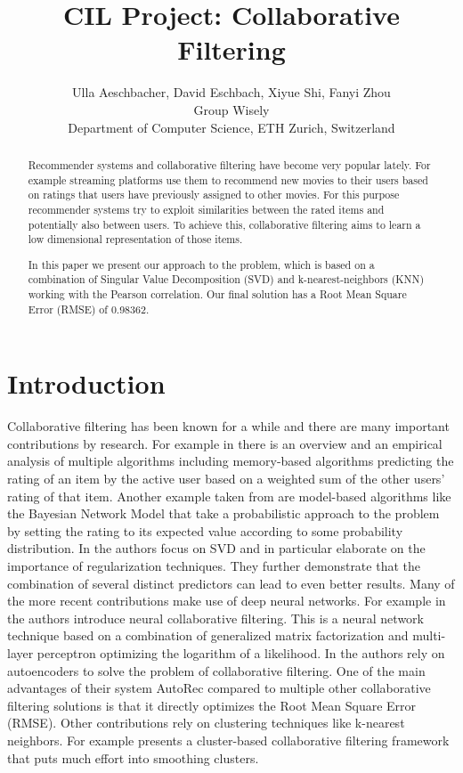 \documentclass[10pt,conference,compsocconf]{IEEEtran}
\begin{document}
\title{CIL Project: Collaborative Filtering}

\author{
	Ulla Aeschbacher, David Eschbach,  Xiyue Shi, Fanyi Zhou\\
	Group Wisely\\
	Department of Computer Science, ETH Zurich, Switzerland
}

\maketitle

\begin{abstract}
Recommender systems and collaborative filtering have become very popular lately. For example streaming platforms use them to recommend new movies to their users based on ratings that users have previously assigned to other movies. For this purpose recommender systems try to exploit similarities between the rated items and potentially also between users. To achieve this, collaborative filtering aims to learn a low dimensional representation of those items.

In this paper we present our approach to the problem, which is based on a combination of Singular Value Decomposition (SVD) and k-nearest-neighbors (KNN) working with the Pearson correlation. Our final solution has a Root Mean Square Error (RMSE) of 0.98362.
\end{abstract}

\section{Introduction}
Collaborative filtering has been known for a while and there are many important contributions by research. For example in \cite{breese} there is an overview and an empirical analysis of multiple algorithms including memory-based algorithms predicting the rating of an item by the active user based on a weighted sum of the other users' rating of that item. Another example taken from \cite{breese} are model-based algorithms like the Bayesian Network Model that take a probabilistic approach to the problem by setting the rating to its expected value according to some probability distribution. In \cite{paterek} the authors focus on SVD and in particular elaborate on the importance of regularization techniques. They further demonstrate that the combination of several distinct predictors can lead to even better results. Many of the more recent contributions make use of deep neural networks. For example in \cite{he} the authors introduce neural collaborative filtering. This is a neural network technique based on a combination of generalized matrix factorization and multi-layer perceptron optimizing the logarithm of a likelihood. In \cite{sedhain} the authors rely on autoencoders to solve the problem of collaborative filtering. One of the main advantages of their system AutoRec compared to multiple other collaborative filtering solutions is that it directly optimizes the Root Mean Square Error (RMSE). Other contributions rely on clustering techniques like k-nearest neighbors. For example \cite{xue} presents a cluster-based collaborative filtering framework that puts much effort into smoothing clusters.
\end{document}
